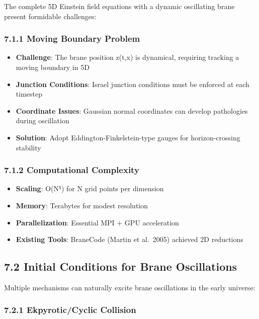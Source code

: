 \documentclass[
  11pt,
]{report}
\providecommand{\tightlist}{%
  \setlength{\itemsep}{0pt}\setlength{\parskip}{0pt}}
\begin{document}
The complete 5D Einstein field equations with a dynamic oscillating
brane present formidable challenges:

\subsubsection{7.1.1 Moving Boundary
Problem}\label{moving-boundary-problem}

\begin{itemize}
\tightlist
\item
  \textbf{Challenge}: The brane position z(t,x) is dynamical, requiring
  tracking a moving boundary in 5D
\item
  \textbf{Junction Conditions}: Israel junction conditions must be
  enforced at each timestep
\item
  \textbf{Coordinate Issues}: Gaussian normal coordinates can develop
  pathologies during oscillation
\item
  \textbf{Solution}: Adopt Eddington-Finkelstein-type gauges for
  horizon-crossing stability
\end{itemize}

\subsubsection{7.1.2 Computational
Complexity}\label{computational-complexity}

\begin{itemize}
\tightlist
\item
  \textbf{Scaling}: O(N⁵) for N grid points per dimension
\item
  \textbf{Memory}: Terabytes for modest resolution
\item
  \textbf{Parallelization}: Essential MPI + GPU acceleration
\item
  \textbf{Existing Tools}: BraneCode (Martin et al.~2005) achieved 2D
  reductions
\end{itemize}

\subsection{7.2 Initial Conditions for Brane
Oscillations}\label{initial-conditions-for-brane-oscillations}

Multiple mechanisms can naturally excite brane oscillations in the early
universe:

\subsubsection{7.2.1 Ekpyrotic/Cyclic
Collision}\label{ekpyroticcyclic-collision}
\end{document}
